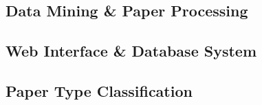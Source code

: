 %  
%


\subsection{ Data Mining \& Paper Processing}


\subsection{ Web Interface \& Database System}


\subsection{ Paper Type Classification }
